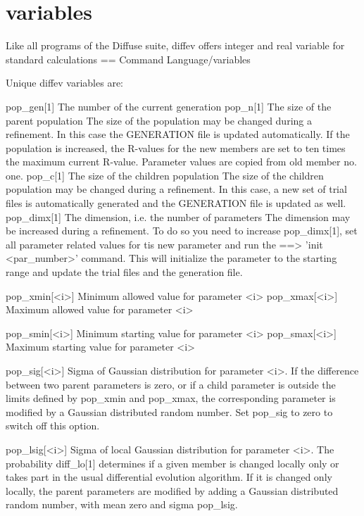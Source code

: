 \section{variables}
\par
Like all programs of the Diffuse suite, diffev offers integer and 
real variable for standard calculations == Command Language/variables 
\par
Unique diffev variables are: 
\par
\begin{MacVerbatim}
pop_gen[1]    The number of the current generation
pop_n[1]      The size of the parent population
              The size of the population may be changed during a
              refinement. In this case the GENERATION file is updated
              automatically. If the population is increased, the R-values
              for the new members are set to ten times the maximum
              current R-value. Parameter values are copied from old
              member no. one.
pop_c[1]      The size of the children population
              The size of the children population may be changed during a
              refinement. In this case, a new set of trial files is
              automatically generated and the GENERATION file is updated
              as well.
pop_dimx[1]   The dimension, i.e. the number of parameters
              The dimension may be increased during a refinement. To do
              so you need to increase pop_dimx[1], set all parameter
              related values for tis new parameter and run the
              ==> 'init <par_number>' command. This will initialize the
              parameter to the starting range and update the trial files
              and the generation file.

pop_xmin[<i>] Minimum allowed value for parameter <i>
pop_xmax[<i>] Maximum allowed value for parameter <i>

pop_smin[<i>] Minimum starting value for parameter <i>
pop_smax[<i>] Maximum starting value for parameter <i>

pop_sig[<i>]  Sigma of Gaussian distribution for parameter <i>. If the
              difference between two parent parameters is zero, or if a
              child parameter is outside the limits defined by pop_xmin
              and pop_xmax, the corresponding parameter is modified by
              a Gaussian distributed random number.
              Set pop_sig to zero to switch off this option.

pop_lsig[<i>] Sigma of local Gaussian distribution for parameter <i>.
              The probability diff_lo[1] determines if a given member
              is changed locally only or takes part in the usual
              differential evolution algorithm. If it is changed only
              locally, the parent parameters are modified by adding
              a Gaussian distributed random number, with mean zero
              and sigma pop_lsig.


\end{MacVerbatim}
